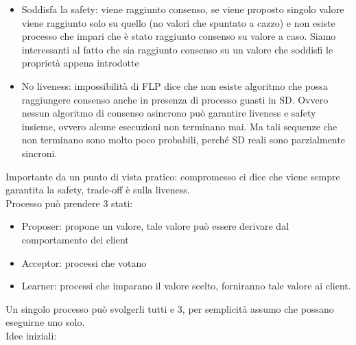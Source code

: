 \documentclass{article}
\begin{document}
\begin{itemize}
\item Soddisfa la safety: viene raggiunto consenso, se viene proposto singolo valore viene raggiunto solo su quello (no valori che spuntato a cazzo) e non esiste processo che impari che è stato raggiunto consenso su valore a caso. Siamo interessanti al fatto che sia raggiunto consenso su un valore che soddisfi le proprietà appena introdotte
\item No liveness: impossibilità di FLP dice che non esiste algoritmo che possa raggiungere consenso anche in presenza di processo guasti in SD. Ovvero nessun algoritmo di consenso asincrono può garantire liveness e safety insieme, ovvero alcune esecuzioni non terminano mai. Ma tali sequenze che non terminano sono molto poco probabili, perché SD reali sono parzialmente sincroni.
\end{itemize}
Importante da un punto di vista pratico: compromesso ci dice che viene sempre garantita la safety, trade-off è sulla liveness.\\ Processo può prendere 3 stati:
\begin{itemize}
\item Proposer: propone un valore, tale valore può essere derivare dal comportamento dei client
\item Acceptor: processi che votano
\item Learner: processi che imparano il valore scelto, forniranno tale valore ai client.
\end{itemize}
Un singolo processo può svolgerli tutti e 3, per semplicità assumo che possano eseguirne uno solo.\\ Idee iniziali:
\end{document}
